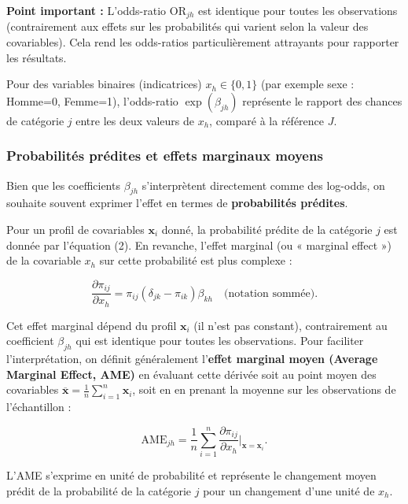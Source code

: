 \documentclass[12pt,a4paper]{article}
\begin{document}
\textbf{Point important :} L'odds-ratio $\text{OR}_{jh}$ est identique pour toutes les observations (contrairement aux effets sur les probabilités qui varient selon la valeur des covariables). Cela rend les odds-ratios particulièrement attrayants pour rapporter les résultats.

Pour des variables binaires (indicatrices) $x_h \in \{0, 1\}$ (par exemple sexe : Homme=0, Femme=1), l'odds-ratio $\exp(\beta_{jh})$ représente le rapport des chances de catégorie $j$ entre les deux valeurs de $x_h$, comparé à la référence $J$.

\subsubsection{Probabilités prédites et effets marginaux moyens}

Bien que les coefficients $\beta_{jh}$ s'interprètent directement comme des log-odds, on souhaite souvent exprimer l'effet en termes de \textbf{probabilités prédites}.

Pour un profil de covariables $\mathbf{x}_i$ donné, la probabilité prédite de la catégorie $j$ est donnée par l'équation (2). En revanche, l'effet marginal (ou « marginal effect ») de la covariable $x_h$ sur cette probabilité est plus complexe :

\begin{equation}
\frac{\partial \pi_{ij}}{\partial x_h} = \pi_{ij}(\delta_{jk} - \pi_{ik}) \beta_{kh} \quad \text{(notation sommée)}.
\end{equation}

Cet effet marginal dépend du profil $\mathbf{x}_i$ (il n'est pas constant), contrairement au coefficient $\beta_{jh}$ qui est identique pour toutes les observations. Pour faciliter l'interprétation, on définit généralement l'\textbf{effet marginal moyen (Average Marginal Effect, AME)} en évaluant cette dérivée soit au point moyen des covariables $\overline{\mathbf{x}} = \frac{1}{n}\sum_{i=1}^n \mathbf{x}_i$, soit en en prenant la moyenne sur les observations de l'échantillon :

\begin{equation}
\text{AME}_{jh} = \frac{1}{n} \sum_{i=1}^n \frac{\partial \pi_{ij}}{\partial x_h} \bigg|_{\mathbf{x}=\mathbf{x}_i}.
\end{equation}

L'AME s'exprime en unité de probabilité et représente le changement moyen prédit de la probabilité de la catégorie $j$ pour un changement d'une unité de $x_h$.
\end{document}

